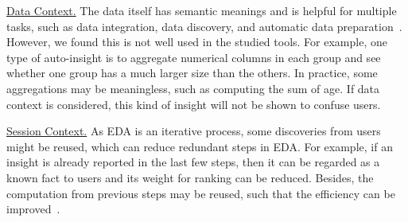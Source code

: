 \documentclass[11pt]{article}
\begin{document}
\underline{Data Context.} The data itself has semantic meanings and is helpful for multiple tasks, such as data integration, data discovery, and automatic data preparation~\cite{DBLP:conf/cidr/HulsebosGGDGD22}. However, we found this is not well used in the studied tools. For example, one type of auto-insight is to aggregate numerical columns in each group and see whether one group has a much larger size than the others. In practice, some aggregations may be meaningless, such as computing the sum of age. If data context is considered, this kind of insight will not be shown to confuse users. 

\underline{Session Context.} As EDA is an iterative process, some discoveries from users might be reused, which can reduce redundant steps in EDA. For example, if an insight is already reported in the last few steps, then it can be regarded as a known fact to users and its weight for ranking can be reduced. Besides, the computation from previous steps may be reused, such that the efficiency can be improved~\cite{DBLP:conf/sigmod/CrottyGZBK16}. 
\end{document}
